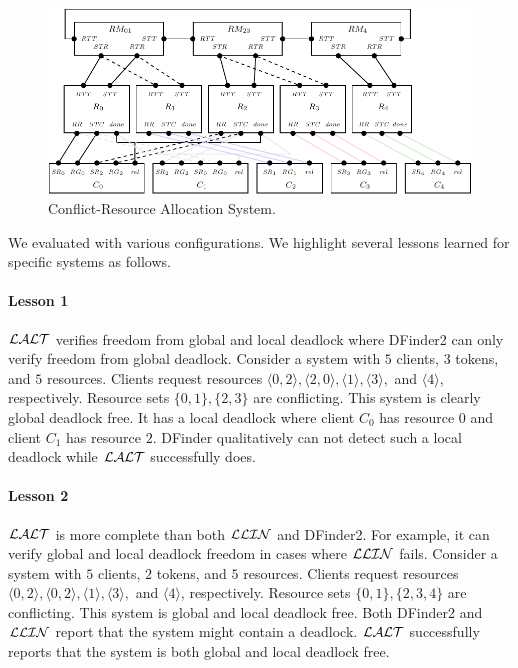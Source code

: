 \begin{figure}[H]
\begin{center}
\includegraphics[scale=0.9]{compiledfigures/resourceallocation-crop.pdf}
\caption{Conflict-Resource Allocation System.}
\label{fig:resourceallocation}
\end{center}
\end{figure}

We evaluated \deadlocktool{} with various configurations.
We highlight several lessons learned for specific systems as follows. 

\paragraph{Lesson 1} 
$\mathcal{LALT}$ verifies freedom from global and local deadlock where DFinder2 can only verify freedom from global deadlock.
Consider a system with $5$ clients, $3$ tokens, and $5$ resources.
Clients request resources $\langle 0, 2\rangle, \langle 2, 0\rangle, \langle 1 \rangle, \langle 3\rangle,$ and $\langle 4\rangle$, respectively.
Resource sets $\{ 0, 1\}, \{2,3\}$ are conflicting. 
This system is clearly global deadlock free. 
It has a local deadlock where client $C_0$ has resource $0$ and client $C_1$ has resource $2$. 
DFinder qualitatively can not detect such a local deadlock while $\mathcal{LALT}$ successfully does. 

\paragraph{Lesson 2} 
$\mathcal{LALT}$ is more complete than both $\mathcal{LLIN}$ and DFinder2. For example, it can verify global and local deadlock freedom in cases where $\mathcal{LLIN}$ fails. 
Consider a system with $5$ clients, $2$ tokens, and $5$ resources.
Clients request resources $\langle0, 2\rangle, \langle 0, 2\rangle, \langle 1 \rangle, \langle 3\rangle,$ and $\langle 4\rangle$, respectively.
Resource sets $\{ 0, 1\}, \{2,3,4\}$ are conflicting. 
This system is global and local deadlock free. 
Both DFinder2 and $\mathcal{LLIN}$ report that the system might contain a deadlock. 
$\mathcal{LALT}$ successfully reports that the system is both global and local deadlock free. 

